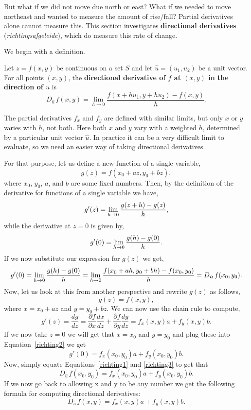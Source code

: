 But what if we did not move due north or east? What if we needed to move northeast and wanted to measure the amount of rise/fall? Partial derivatives alone cannot measure this. This section investigates \textbf{directional derivatives} (\textit{richtingsafgeleide}), which do measure this rate of change. 

We begin with a definition.

\begin{definition}\label{def:direct_deriv}
Let $z=f(x,y)$ be continuous on a set $S$ and let $\hat u = \left(u_1,u_2\right)$ be a unit vector. For all points $(x,y)$, the \textbf{directional derivative of $f$ at $(x,y)$ in the direction of $\hat u$} is
$$D_{\hat u\,}f(x,y) = \lim_{h\to 0} \frac{f(x+hu_1,y+hu_2) - f(x,y)}h.$$
\end{definition}

The partial derivatives $f_x$ and $f_y$ are defined with similar limits, but only $x$ or $y$ varies with $h$, not both. Here both $x$ and $y$ vary with a weighted $h$, determined by a particular unit vector $\hat u$. In practice it can be a very difficult limit to evaluate, so we need an easier way of taking directional derivatives. 

For that purpose, let us define a new function of a single variable,
$$
g(z)=f(x_0+az,y_0+bz),
$$
where $x_0$, $y_0$, $a$, and $b$ are some fixed numbers. Then, by the definition of the derivative for functions of a single variable we have,
$$
g'(z)=\displaystyle\lim_{h\to0}\dfrac{g(z+h)-g(z)}{h},
$$
while the derivative at $z=0$ is given by,
$$
g'(0)=\displaystyle\lim_{h\to0}\dfrac{g(h)-g(0)}{h}.
$$
If we now substitute our expression for $g(z)$ we get,
\begin{equation}
g'(0)=\ds\lim_{h\to0}\dfrac{g(h)-g(0)}{h}=\ds\lim_{h\to0}\dfrac{f(x_0+ah,y_0+bh)-f(x_0,y_0)}{h}=D_{\hat u\,}f(x_0,y_0).
\label{richting1}
\end{equation}
Now, let us look at this from another perspective and rewrite $g(z)$ as follows,
$$
g(z)=f(x,y),
$$
where $x=x_0+az$ and $y=y_0+bz$. We can now use the chain rule to compute,
\begin{equation}
g'(z)=\dfrac{dg}{dz}=\dfrac{\partial f}{\partial x}\dfrac{dx}{dz}+\dfrac{\partial f}{\partial y}\dfrac{dy}{dz}=f_x(x,y)a+f_y(x,y)b.
\label{richting2}
\end{equation}
If we now take $z=0$ we will get that $x=x_0$ and $y=y_0$ and plug these into Equation~\eqref{richting2} we get
\begin{equation}
g'(0)=f_x(x_0,y_0)a+f_y(x_0,y_0)b.
\label{richting3}
\end{equation}
Now, simply equate Equations~\eqref{richting1} and \eqref{richting3} to get that
$$
D_{\hat u\,}f(x_0,y_0)=f_x(x_0,y_0)a+f_y(x_0,y_0)b.
$$
If we now go back to allowing x and y to be any number we get the following formula for computing directional derivatives:
$$
D_{\hat u\,}f(x,y)=f_x(x,y)a+f_y(x,y)b.
$$

